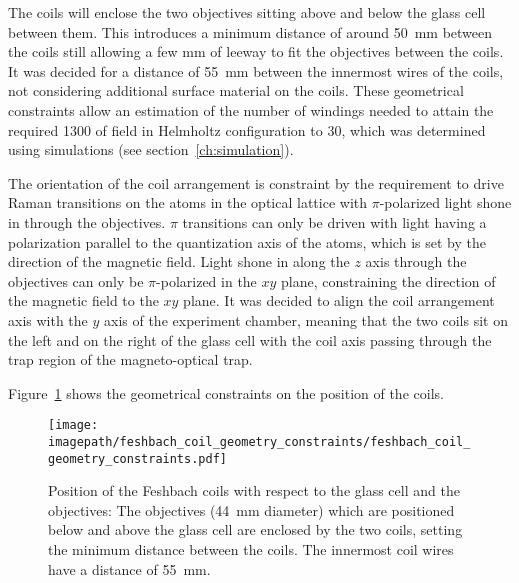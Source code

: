 The coils will enclose the two objectives sitting above and below the glass cell between them. This introduces a minimum distance of around \SI{50}{\milli\meter} between the coils still allowing a few \si[]{\milli\meter} of leeway to fit the objectives between the coils. It was decided for a distance of \SI{55}{\milli\meter} between the innermost wires of the coils, not considering additional surface material on the coils. These geometrical constraints allow an estimation of the number of windings needed to attain the required \SI{1300}{\gauss} of field in Helmholtz configuration to 30, which was determined using simulations (see section~\ref{ch:simulation}).

The orientation of the coil arrangement is constraint by the requirement to drive Raman transitions on the atoms in the optical lattice with $\pi$-polarized light shone in through the objectives. $\pi$ transitions can only be driven with light having a polarization parallel to the quantization axis of the atoms, which is set by the direction of the magnetic field. Light shone in along the $z$ axis through the objectives can only be $\pi$-polarized in the $xy$ plane, constraining the direction of the magnetic field to the $xy$ plane. It was decided to align the coil arrangement axis with the $y$ axis of the experiment chamber, meaning that the two coils sit on the left and on the right of the glass cell with the coil axis passing through the trap region of the magneto-optical trap.

Figure~\ref{fig:feshbach_coil_geometry_constraints} shows the geometrical constraints on the position of the coils.

\begin{figure}
    \centering
    \texttt{[image: \\imagepath/feshbach\_coil\_geometry\_constraints/feshbach\_coil\_geometry\_constraints.pdf]}
    \caption{Position of the Feshbach coils with respect to the glass cell and the objectives: The objectives (\SI{44}{\milli\meter} diameter) which are positioned below and above the glass cell are enclosed by the two coils, setting the minimum distance between the coils. The innermost coil wires have a distance of \SI{55}{\milli\meter}.}
    \label{fig:feshbach_coil_geometry_constraints}
\end{figure}

